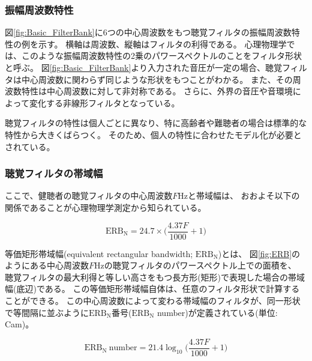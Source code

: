 \subsubsection{振幅周波数特性}
図\ref{fig:Basic_FilterBank}に6つの中心周波数をもつ聴覚フィルタの振幅周波数特性の例を示す。
横軸は周波数、縦軸はフィルタの利得である。
心理物理学では、このような振幅周波数特性の2乗のパワースペクトルのことをフィルタ形状と呼ぶ。
図\ref{fig:Basic_FilterBank}より入力された音圧が一定の場合、聴覚フィルタは中心周波数に関わらず同じような形状をもつことがわかる。
また、その周波数特性は中心周波数に対して非対称である。
さらに、外界の音圧や音環境によって変化する非線形フィルタとなっている。

聴覚フィルタの特性は個人ごとに異なり、特に高齢者や難聴者の場合は標準的な特性から大きくばらつく。
そのため、個人の特性に合わせたモデル化が必要とされている。

\subsubsection{聴覚フィルタの帯域幅}
ここで、健聴者の聴覚フィルタの中心周波数$F$Hzと帯域幅は、
おおよそ以下の関係であることが心理物理学測定から知られている\cite{moore2013introduction}。

\begin{equation}
	\mathrm{ERB_N} = 24.7 \times\bigl(\frac{4.37F}{1000} + 1\bigr)
    \label{eq:ERB}
\end{equation}

等価矩形帯域幅(equivalent rectangular bandwidth; $\mathrm{ERB_N}$)とは、
図\ref{fig:ERB}のようにある中心周波数$F$Hzの聴覚フィルタのパワースペクトル上での面積を、
聴覚フィルタの最大利得と等しい高さをもつ長方形(矩形)で表現した場合の帯域幅(底辺)である。
この等価矩形帯域幅自体は、任意のフィルタ形状で計算することができる。
この中心周波数によって変わる帯域幅のフィルタが、同一形状で等間隔に並ぶように$\mathrm{ERB_N}$番号($\mathrm{ERB_N}$ number)が定義されている(単位: Cam)。

\begin{equation}
    \mathrm{ERB_N \ number} = 21.4 \log_{10} \bigl(\frac{4.37F}{1000} + 1\bigr)
\end{equation}

